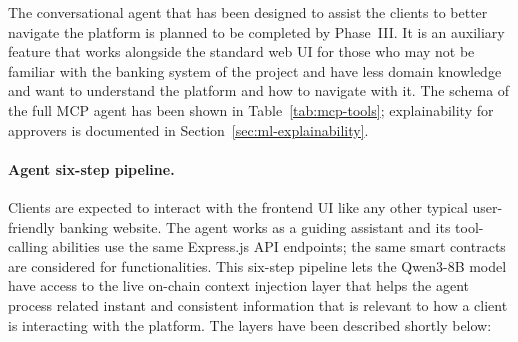 \documentclass[12pt,a4paper]{report}
\begin{document}
The conversational agent that has been designed to assist the clients to better navigate the platform is planned to be completed by Phase~III. It is an auxiliary feature that works alongside the standard web UI for those who may not be familiar with the banking system of the project and have less domain knowledge and want to understand the platform and how to navigate with it. The schema of the full MCP agent has been shown in Table~\ref{tab:mcp-tools}; explainability for approvers is documented in Section~\ref{sec:ml-explainability}.

\paragraph{Agent six-step pipeline.} Clients are expected to interact with the frontend UI like any other typical user-friendly banking website. The agent works as a guiding assistant and its tool-calling abilities use the same Express.js API endpoints; the same smart contracts are considered for functionalities. This six-step pipeline lets the Qwen3-8B model have access to the live on-chain context injection layer that helps the agent process related instant and consistent information that is relevant to how a client is interacting with the platform. The layers have been described shortly below:
\end{document}
